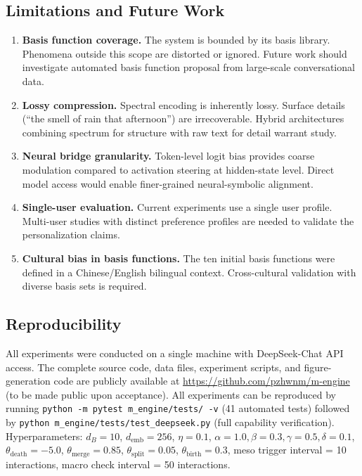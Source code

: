 \documentclass[review]{elsarticle}
\begin{document}
\subsection{Limitations and Future Work}

\begin{enumerate}[leftmargin=*,itemsep=0pt]
\item \textbf{Basis function coverage.} The system is bounded by its basis
  library. Phenomena outside this scope are distorted or ignored. Future work
  should investigate automated basis function proposal from large-scale
  conversational data.
\item \textbf{Lossy compression.} Spectral encoding is inherently lossy.
  Surface details (``the smell of rain that afternoon'') are irrecoverable.
  Hybrid architectures combining spectrum for structure with raw text for
  detail warrant study.
\item \textbf{Neural bridge granularity.} Token-level logit bias provides
  coarse modulation compared to activation steering at hidden-state level.
  Direct model access would enable finer-grained neural-symbolic alignment.
\item \textbf{Single-user evaluation.} Current experiments use a single user
  profile. Multi-user studies with distinct preference profiles are needed
  to validate the personalization claims.
\item \textbf{Cultural bias in basis functions.} The ten initial basis
  functions were defined in a Chinese/English bilingual context. Cross-cultural
  validation with diverse basis sets is required.
\end{enumerate}

\subsection{Reproducibility}

All experiments were conducted on a single machine with DeepSeek-Chat API
access. The complete source code, data files, experiment scripts, and
figure-generation code are publicly available at
\url{https://github.com/pzhwnm/m-engine} (to be made public upon acceptance).
All experiments can be reproduced by running \texttt{python -m pytest m\_engine/tests/ -v}
(41 automated tests) followed by \texttt{python m\_engine/tests/test\_deepseek.py}
(full capability verification).
Hyperparameters: $d_B = 10$, $d_{\text{emb}} = 256$, $\eta = 0.1$,
$\alpha = 1.0, \beta = 0.3, \gamma = 0.5, \delta = 0.1$,
$\theta_{\text{death}} = -5.0$, $\theta_{\text{merge}} = 0.85$,
$\theta_{\text{split}} = 0.05$, $\theta_{\text{birth}} = 0.3$,
meso trigger interval = 10 interactions, macro check interval = 50
interactions.
\end{document}
